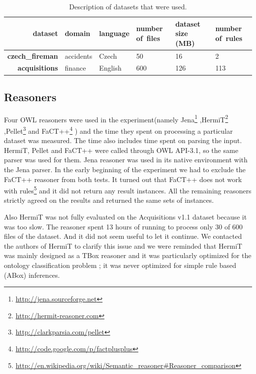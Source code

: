 \begin{table}
\begin{center}
\begin{tabular}{|r||l|l|b{20mm}|b{20mm}|b{20mm}|}
\hline
dataset & domain & language & number of~files &  dataset size (MB) &  number of~rules  \\
\hline
\hline
\textbf{czech\_fireman} & accidents & Czech &  50 &  16 &  2\\
\hline
\textbf{acquisitions} & finance & English &  600 &  126 &  113\\
\hline
\end{tabular}
\caption{Description of datasets that were used.}\label{tab:datasets}
\end{center}
\end{table}




\subsection{Reasoners}

Four OWL reasoners were used in the experiment(namely
Jena\footnote{\url{http://jena.sourceforge.net}}
,HermiT\footnote{\url{http://hermit-reasoner.com}}
,Pellet\footnote{\url{http://clarkparsia.com/pellet}}
and FaCT++\footnote{\url{http://code.google.com/p/factplusplus}}
) and the time they spent on processing a particular dataset was measured. The time also includes time spent on parsing the input. HermiT, Pellet and FaCT++ were called through OWL API-3.1, so the same parser was used for them. Jena reasoner was used in its native environment with the Jena parser.
In the early beginning of the experiment we had to exclude the FaCT++ reasoner from both tests. It turned out that FaCT++ does not work with rules\footnote{\url{http://en.wikipedia.org/wiki/Semantic_reasoner#Reasoner_comparison}} and it did not return any result instances.  All the remaining reasoners strictly agreed on the results and returned the same sets of instances.

Also HermiT was not fully evaluated on the Acquisitions v1.1 dataset because it was too slow. The reasoner spent 13 hours of running to process only 30 of 600 files of the dataset. And it did not seem useful to let it continue. We contacted the authors of HermiT to clarify this issue and we were reminded that HermiT was mainly designed as a TBox reasoner and it was particularly optimized for the ontology classification problem \citep{ghms10classification}; it was never optimized for simple rule based (ABox) inferences.












